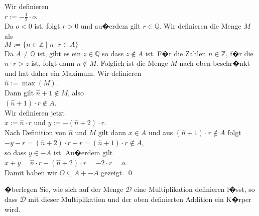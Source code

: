 \begin{enumerate}
      Wir definieren 
      \\[0.2cm]
      \hspace*{1.3cm}
      $r := -\frac{1}{2} \cdot o$.
      \\[0.2cm]
      Da $o < 0$ ist, folgt $r > 0$ und au�erdem gilt $r \in \mathbb{Q}$.  Wir definieren die Menge
      $M$ als
      \\[0.2cm]
      \hspace*{1.3cm}
      $M := \{ n \in \mathbb{Z} \mid n \cdot r \in  A \}$
      \\[0.2cm]
      Da $A \not= \mathbb{Q}$ ist, gibt es ein $z \in \mathbb{Q}$ so dass $z \not\in A$ ist.
      F�r die Zahlen $n \in \mathbb{Z}$, f�r die $n \cdot r > z$ ist, folgt dann $n \not\in M$.
      Folglich ist die Menge $M$ nach oben beschr�nkt und hat daher ein Maximum.  Wir definieren
      \\[0.2cm]
      \hspace*{1.3cm}
      $\widehat{n} := \max(M)$.
      \\[0.2cm]
      Dann gilt $\widehat{n} + 1 \not\in M$, also 
      \\[0.2cm]
      \hspace*{1.3cm}
      $(\widehat{n} + 1) \cdot r \not\in A$.  
      \\[0.2cm]
      Wir  definieren  jetzt
      \\[0.2cm]
      \hspace*{1.3cm}
      $x := \widehat{n} \cdot r$ \quad und \quad $y := -(\widehat{n} + 2) \cdot r$.  
      \\[0.2cm]
      Nach  Definition von $\widehat{n}$ und $M$ gilt dann $x \in A$ und aus 
      $(\widehat{n} + 1) \cdot r \not\in A$ folgt
      \\[0.2cm]
      \hspace*{1.3cm}
      $-y - r = (\widehat{n} + 2) \cdot r - r = (\widehat{n} + 1) \cdot r \not\in A$,
      \\[0.2cm]
      so dass $y \in -\!A$ ist.  Au�erdem gilt
      \\[0.2cm]
      \hspace*{1.3cm}
      $x + y = \widehat{n} \cdot r - (\widehat{n} + 2) \cdot r = - 2 \cdot r = o$.
      \\[0.2cm]
      Damit haben wir $O \subseteq A + -\!A$ gezeigt. 
      \qed
\end{enumerate}


\exercise
�berlegen Sie, wie sich auf der Menge $\mathcal{D}$ eine Multiplikation definieren l�sst,
so dass $\mathcal{D}$ mit dieser Multiplikation und der oben definierten Addition ein K�rper wird.


